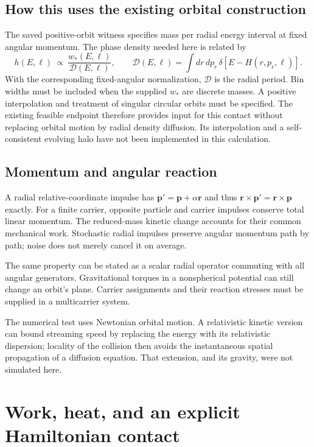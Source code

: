\documentclass[11pt]{article}
\begin{document}
\subsection{How this uses the existing orbital construction}
The saved positive-orbit witness specifies mass per radial energy interval
at fixed angular momentum. The phase density needed here is related by
\begin{equation}
 h(E,\boldsymbol\ell)\ \propto\
 \frac{w_*(E,\boldsymbol\ell)}{\mathcal D(E,\boldsymbol\ell)},
 \qquad
 \mathcal D(E,\boldsymbol\ell)=\int dr\,dp_r\,
       \delta[E-H(r,p_r,\boldsymbol\ell)].
\end{equation}
With the corresponding fixed-angular normalization, $\mathcal D$ is the
radial period. Bin widths must be included when the supplied $w_*$ are
discrete masses. A positive interpolation and treatment of singular circular
orbits must be specified. The existing feasible endpoint therefore provides
input for this contact without replacing orbital motion by radial density
diffusion. Its interpolation and a self-consistent evolving halo have not
been implemented in this calculation.

\subsection{Momentum and angular reaction}
A radial relative-coordinate impulse has
$\mathbf p' =\mathbf p+\alpha\mathbf r$ and thus
$\mathbf r\times\mathbf p'=\mathbf r\times\mathbf p$ exactly.
For a finite carrier, opposite particle and carrier impulses conserve total
linear momentum. The reduced-mass kinetic change accounts for their common
mechanical work. Stochastic radial impulses preserve angular momentum
path by path; noise does not merely cancel it on average.

The same property can be stated as a scalar radial operator commuting with
all angular generators. Gravitational torques in a nonspherical potential
can still change an orbit's plane. Carrier assignments and their reaction
stresses must be supplied in a multicarrier system.

The numerical test uses Newtonian orbital motion. A relativistic kinetic
version can bound streaming speed by replacing the energy with its
relativistic dispersion; locality of the collision then avoids the
instantaneous spatial propagation of a diffusion equation. That extension,
and its gravity, were not simulated here.

\section{Work, heat, and an explicit Hamiltonian contact}
\end{document}
